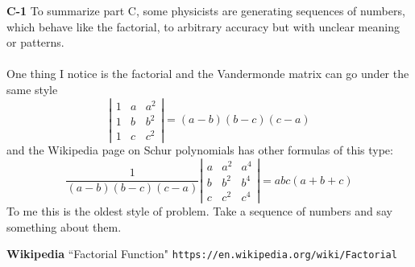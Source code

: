 \documentclass[12pt]{article}
\begin{document}
\newpage

\noindent \textbf{C-1} To summarize part C, some physicists are generating sequences of numbers, which behave like the factorial, to arbitrary accuracy but with unclear meaning or patterns.  \\ \\
One thing I notice is the factorial and the Vandermonde matrix can go under the same style
$$
\left| \begin{array}{ccc} 1 & a & a^2 \\ 
1 & b & b^2 \\ 
1 & c & c^2 \end{array} \right|
 = (a-b)(b-c)(c-a)
 $$
and the Wikipedia page on Schur polynomials has other formulas of this type:
$$
\frac{1}{(a-b)(b-c)(c-a)} \left| \begin{array}{ccc} a & a^2 & a^4 \\ 
b & b^2 & b^4 \\ 
c & c^2 & c^4 \end{array} \right|
 = abc (a+b+c)
 $$
To me this is the oldest style of problem.  Take a sequence of numbers and say something about them.
 
\newpage

\selectfont \fontsize{12}{10}\selectfont

\begin{thebibliography}{}

\item \textbf{Wikipedia} ``Factorial Function" \texttt{https://en.wikipedia.org/wiki/Factorial}

\end{thebibliography}
\end{document}
